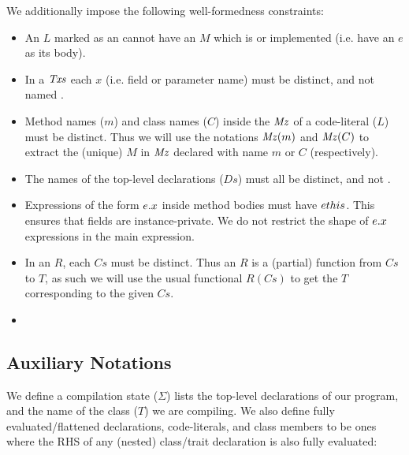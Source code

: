 We additionally impose the following well-formedness constraints:
\begin{itemize}
	\item An $L$ marked as an  cannot have an $M$ which is  or implemented (i.e. have an $e$ as its body).
	
	\item In a $\mathit{Txs}$ each $x$ (i.e. field or parameter name) must be distinct, and not named . 
	
	\item Method names ($m$) and class names ($C$) inside the $\mathit{Mz}$ of a code-literal ($L$) must be distinct. Thus we will use the notations $\mathit{Mz}(m)$ and $\mathit{Mz}(C)$ to extract the (unique) $M$ in $\mathit{Mz}$ declared with name $m$ or $C$ (respectively).
	
	\item The names of the top-level declarations ($Ds$) must all be distinct, and not \This.

	\item Expressions of the form $\ef{e}{x}$ inside method bodies must have $e \Q{this}$. This ensures that fields are instance-private. We do not restrict the shape of $\ef{e}{x}$ expressions in the main expression. 
	
	\item In an $R$, each $Cs$ must be distinct. Thus an $R$ is a (partial) function from $Cs$ to $T$, as such we will use the usual functional $R(Cs)$ to get the $T$ corresponding to the given $Cs$. 
	\item {}
\end{itemize}


\subsection{Auxiliary Notations}
We define a compilation state ($\Sigma$) lists the top-level declarations of our program, and the name of the class ($T$) we are compiling. We also define fully evaluated/flattened declarations, code-literals, and class members to be ones where the RHS of any (nested) class/trait declaration is also fully evaluated:

\begin{grammar}
	\midrule
\end{grammar}



